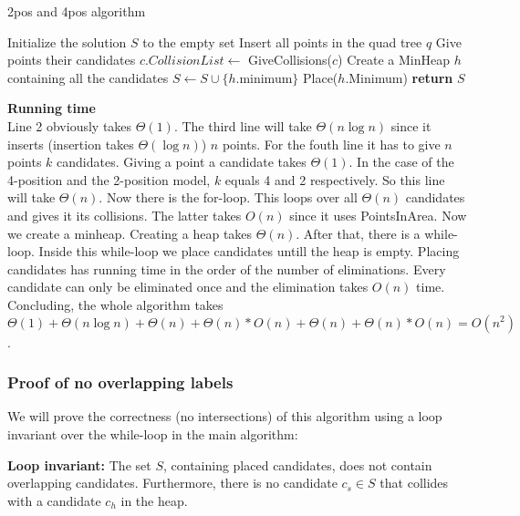 \documentclass[crop=false,a4paper,oneside,11pt]{article}
\begin{document}
\begin{algorithm}[H]
\caption{2pos and 4pos algorithm}
\begin{algorithmic}[1]
\State Initialize the solution $S$ to the empty set
\State Insert all points in the quad tree $q$
\State Give points their candidates
\State $c.CollisionList\gets$ GiveCollisions($c$)
\EndFor
\State Create a MinHeap $h$ containing all the candidates
\State $S\gets S\cup \{h.$minimum$\}$
\State Place($h$.Minimum)
\EndWhile
\State \textbf{return} $S$
\EndProcedure
\end{algorithmic}
\end{algorithm}
\textbf{Running time}\\
Line 2 obviously takes $\Theta(1)$. The third line will take $\Theta(n\log n)$ since it inserts (insertion takes $\Theta(\log n)$) $n$ points. For the fouth line it has to give $n$ points $k$ candidates. Giving a point a candidate takes $\Theta(1)$. In the case of the 4-position and the 2-position model, $k$ equals 4 and 2 respectively. So this line will take $\Theta(n)$. Now there is the for-loop. This loops over all $\Theta(n)$ candidates and gives it its collisions. The latter takes $O(n)$ since it uses PointsInArea. Now we create a minheap. Creating a heap takes $\Theta(n)$. After that, there is a while-loop. Inside this while-loop we place candidates untill the heap is empty. Placing candidates has running time in the order of the number of eliminations. Every candidate can only be eliminated once and the elimination takes $O(n)$ time. Concluding, the whole algorithm takes $\Theta(1)+\Theta(n\log n)+\Theta(n)+\Theta(n)*O(n)+\Theta(n)+\Theta(n)*O(n)=O(n^2)$.

\subsubsection{Proof of no overlapping labels}
We will prove the correctness (no intersections) of this algorithm using a loop invariant over the while-loop in the main algorithm:

\textbf{Loop invariant:} The set $S$, containing placed candidates, does not contain overlapping candidates. Furthermore, there is no candidate $c_s\in S$ that collides with a candidate $c_h$ in the heap.
\end{document}
